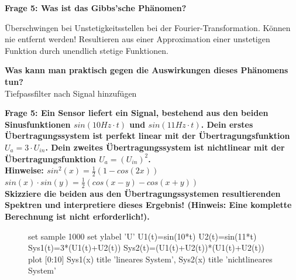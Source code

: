 \documentclass[11pt,a4paper]{scrartcl}
\begin{document}
\textbf{Frage 5: Was ist das Gibbs'sche Phänomen?}
\begin{center}
\end{center}
Überschwingen bei Unstetigkeitsstellen bei der Fourier-Transformation. Können nie entfernt werden! Resultieren aus einer Approximation einer unstetigen Funktion durch unendlich stetige Funktionen.

\textbf{Was kann man praktisch gegen die Auswirkungen dieses Phänomens tun?}\\
Tiefpassfilter nach Signal hinzufügen
\newpage

\textbf{Frage 5: Ein Sensor liefert ein Signal, bestehend aus den beiden Sinusfunktionen $sin(10Hz \cdot t)$ und $sin(11Hz \cdot t)$. Dein erstes Übertragungssystem ist perfekt linear mit der Übertragungsfunktion
$U_{a} = 3 \cdot U_{in}$. Dein zweites Übertragungssystem ist nichtlinear mit der Übertragungsfunktion $U_a =  (U_{in})^2$. \\
Hinweise: $sin^2(x)=\frac{1}{2}(1-cos(2x))$\\$sin(x)\cdot sin(y) = \frac{1}{2}(cos(x-y)-cos(x+y))$\\ 
Skizziere die beiden aus den Übertragungssystemen resultierenden Spektren und interpretiere dieses Ergebnis! (Hinweis: Eine komplette Berechnung ist nicht erforderlich!).}\\
\begin{figure}[H]
	\centering
	\begin{gnuplot}[terminal=pdf,scale=0.8]
			set sample 1000
			set ylabel 'U'
			U1(t)=sin(10*t)
			U2(t)=sin(11*t)
			Sys1(t)=3*(U1(t)+U2(t))
			Sys2(t)=(U1(t)+U2(t))*(U1(t)+U2(t))
			plot [0:10] Sys1(x) title 'lineares System', Sys2(x) title 'nichtlineares System'
	\end{gnuplot}
\end{figure}
\end{document}
